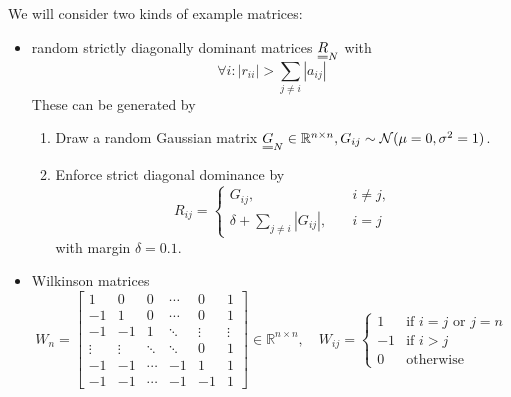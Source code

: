     We will consider two kinds of example matrices:
    \begin{itemize}
        \item random strictly diagonally dominant matrices
        $\mat{R}_N$ with 
        \begin{equation}
            \forall i: |r_{ii}| > \sum_{j \neq i} |a_{ij}| 
        \end{equation}
        These can be generated by
        \begin{enumerate}
            \item Draw a random Gaussian matrix $\mat{G}_N \in \mathbb{R}^{n \times n}, G_{ij} \sim \mathcal{N}(\mu = 0,\sigma^2 = 1)$.
            \item Enforce strict diagonal dominance by
            \begin{equation}
                R_{ij} = \begin{cases}
                    G_{ij}, \quad &i \neq j, \\
                    \delta + \sum_{j \neq i} |G_{ij}|, \quad &i = j
                \end{cases}
            \end{equation}
            with margin $\delta = 0.1$.
        \end{enumerate}
        \item Wilkinson matrices
        \begin{equation}
        W_n = \begin{bmatrix}
        1      & 0      & 0      & \cdots & 0      & 1      \\
        -1     & 1      & 0      & \cdots & 0      & 1      \\
        -1     & -1     & 1      & \ddots & \vdots & \vdots \\
        \vdots & \vdots & \ddots & \ddots & 0      & 1      \\
        -1     & -1     & \cdots & -1     & 1      & 1      \\
        -1     & -1     & \cdots & -1     & -1     & 1      
        \end{bmatrix} \in \mathbb{R}^{n \times n}, \quad W_{ij} = \begin{cases} 
        1 & \text{if } i = j \text{ or } j = n \\
        -1 & \text{if } i > j \\
        0 & \text{otherwise}
        \end{cases}
        \end{equation}
    \end{itemize}

